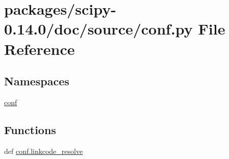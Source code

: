 \hypertarget{scipy-0_814_80_2doc_2source_2conf_8py}{}\section{packages/scipy-\/0.14.0/doc/source/conf.py File Reference}
\label{scipy-0_814_80_2doc_2source_2conf_8py}
\subsection*{Namespaces}
\begin{DoxyCompactItemize}
\item 
 \hyperlink{namespaceconf}{conf}
\end{DoxyCompactItemize}
\subsection*{Functions}
\begin{DoxyCompactItemize}
\item 
def \hyperlink{namespaceconf_a33aa94cd770584e20ad39bc526304f5e}{conf.\+linkcode\+\_\+resolve}
\end{DoxyCompactItemize}
